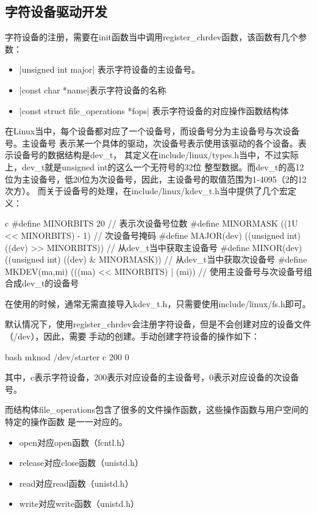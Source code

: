 \subsection{字符设备驱动开发}
字符设备的注册，需要在init函数当中调用register\_chrdev函数，该函数有几个参数：
\begin{itemize}
    \item {}|unsigned int major| 表示字符设备的主设备号。
    \item {}|const char *name|表示字符设备的名称
    \item {}|const struct file_operations *fops| 表示字符设备的对应操作函数结构体
\end{itemize}

在Linux当中，每个设备都对应了一个设备号，而设备号分为主设备号与次设备号。主设备号
表示某一个具体的驱动，次设备号表示使用该驱动的各个设备。表示设备号的数据结构是dev\_t，
其定义在include/linux/types.h当中，不过实际上，dev\_t就是unsigned int的这么一个无符号的32位
整型数据。而dev\_t的高12位为主设备号，低20位为次设备号，因此，主设备号的取值范围为1-4095（2的12次方）。
而关于设备号的处理，在include/linux/kdev\_t.h当中提供了几个宏定义：

\begin{code-block}{c}
#define MINORBITS     20     // 表示次设备号位数
#define MINORMASK     ((1U << MINORBITS) - 1) // 次设备号掩码
#define MAJOR(dev)    ((unsigned int) ((dev) >> MINORBITS)) // 从dev_t当中获取主设备号
#define MINOR(dev)    ((unsigned int) ((dev) & MINORMASK))  // 从dev_t当中获取次设备号
#define MKDEV(ma,mi)  (((ma) << MINORBITS) | (mi)) // 使用主设备号与次设备号组合成dev_t的设备号
\end{code-block}
在使用的时候，通常无需直接导入kdev\_t.h，只需要使用include/linux/fs.h即可。

默认情况下，使用register\_chrdev会注册字符设备，但是不会创建对应的设备文件（/dev），因此，需要
手动的创建。手动创建字符设备的操作如下：
\begin{code-block}{bash}
mknod /dev/starter c 200 0
\end{code-block}
其中，c表示字符设备，200表示对应设备的主设备号，0表示对应设备的次设备号。

而结构体file\_operations包含了很多的文件操作函数，这些操作函数与用户空间的特定的操作函数
是一一对应的。
\begin{itemize}
    \item open对应open函数（fcntl.h）
    \item release对应close函数（unistd.h）
    \item read对应read函数（unistd.h）
    \item write对应write函数（unistd.h）
\end{itemize}

